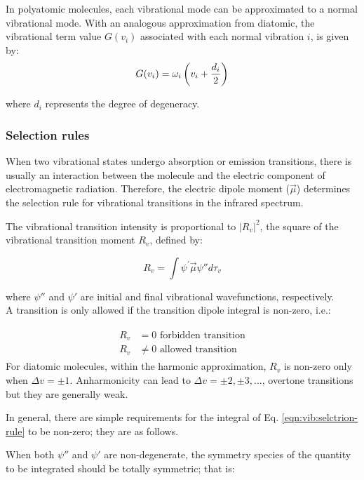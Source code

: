 In polyatomic molecules, each vibrational mode can be approximated to a normal vibrational mode. With an analogous approximation from diatomic, the vibrational term value $G(v_i)$ associated with each normal vibration $i$, is given by:
\[G(v_i) = \omega_i \left( v_i + \frac{d_i}{2} \right)\]

where $d_i$ represents the degree of degeneracy.\\

\subsubsection{Selection rules}
\label{sec:mol-vibration:selection-rule}

When two vibrational states undergo absorption or emission transitions, there is usually an interaction between the molecule and the electric component of electromagnetic radiation. Therefore, the electric dipole moment ($\vec{\mu}$) determines the selection rule for vibrational transitions in the infrared spectrum.

The vibrational transition intensity is proportional to $|R_v|^2$, the square of the vibrational transition moment $R_v$, defined by:

\begin{equation}
    \label{eqn:vib:selctrion-rule}
    R_v = \int \psi^{'} \vec{\mu} \psi{''} d\tau_v
\end{equation}

where $\psi{''}$ and $\psi{'}$ are initial and final vibrational wavefunctions, respectively.\\

A transition is only allowed if the transition dipole integral is non-zero, i.e.:

\begin{align*}
    \begin{split}
        R_v &= 0 \text{ forbidden transition} \\
        R_v &\neq 0 \text{ allowed transition}
    \end{split}
\end{align*}
For diatomic molecules, within the harmonic approximation, $R_v$ is non-zero only when $\Delta v = \pm 1$. Anharmonicity can lead to $\Delta v = \pm 2, \pm 3, ...$, overtone transitions but they are generally weak.

In general, there are simple requirements for the integral of Eq. \ref{eqn:vib:selctrion-rule} to be non-zero; they are as follows.

When both $\psi{''}$ and $\psi{'}$ are non-degenerate, the symmetry species of the quantity to be integrated should be totally symmetric; that is:

